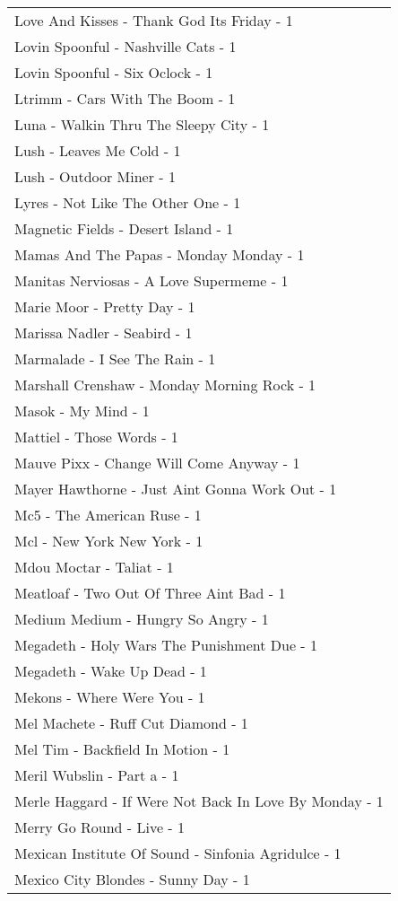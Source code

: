 \documentclass[
]{article}
\begin{document}
\begin{longtable}{l}
Love And Kisses - Thank God Its Friday - 1 \\ 
Lovin Spoonful - Nashville Cats - 1 \\ 
Lovin Spoonful - Six Oclock - 1 \\ 
Ltrimm - Cars With The Boom - 1 \\ 
Luna - Walkin Thru The Sleepy City - 1 \\ 
Lush - Leaves Me Cold - 1 \\ 
Lush - Outdoor Miner - 1 \\ 
Lyres - Not Like The Other One - 1 \\ 
Magnetic Fields - Desert Island - 1 \\ 
Mamas And The Papas - Monday Monday - 1 \\ 
Manitas Nerviosas - A Love Supermeme - 1 \\ 
Marie Moor - Pretty Day - 1 \\ 
Marissa Nadler - Seabird - 1 \\ 
Marmalade - I See The Rain - 1 \\ 
Marshall Crenshaw - Monday Morning Rock - 1 \\ 
Masok - My Mind - 1 \\ 
Mattiel - Those Words - 1 \\ 
Mauve Pixx - Change Will Come Anyway - 1 \\ 
Mayer Hawthorne - Just Aint Gonna Work Out - 1 \\ 
Mc5 - The American Ruse - 1 \\ 
Mcl - New York New York - 1 \\ 
Mdou Moctar - Taliat - 1 \\ 
Meatloaf - Two Out Of Three Aint Bad - 1 \\ 
Medium Medium - Hungry So Angry - 1 \\ 
Megadeth - Holy Wars The Punishment Due - 1 \\ 
Megadeth - Wake Up Dead - 1 \\ 
Mekons - Where Were You - 1 \\ 
Mel Machete - Ruff Cut Diamond - 1 \\ 
Mel Tim - Backfield In Motion - 1 \\ 
Meril Wubslin - Part a - 1 \\ 
Merle Haggard - If Were Not Back In Love By Monday - 1 \\ 
Merry Go Round - Live - 1 \\ 
Mexican Institute Of Sound - Sinfonia Agridulce - 1 \\ 
Mexico City Blondes - Sunny Day - 1 \\ 

\end{longtable}
\end{document}
